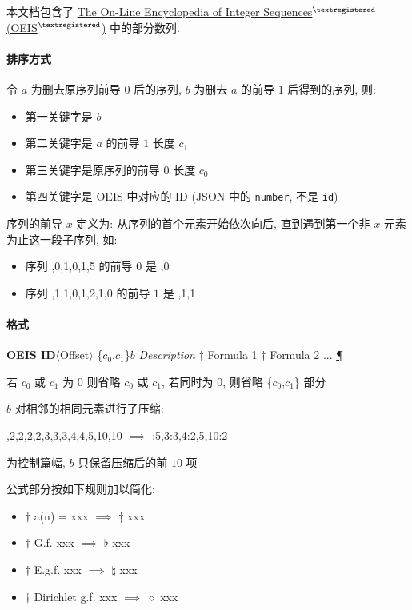 \documentclass{oeiscommon}
\begin{document}
\thispagestyle{empty}

本文档包含了 \href{\oeis}{The On-Line Encyclopedia of Integer Sequences{\(^{\textregistered}\)} (OEIS{\(^{\textregistered}\)})} 中的部分数列.

\paragraph{排序方式} 令 \(a\) 为删去原序列前导 \(0\) 后的序列, \(b\) 为删去 \(a\) 的前导 \(1\) 后得到的序列, 则:

\begin{itemize}
    \item 第一关键字是 \(b\)
    \item 第二关键字是 \(a\) 的前导 \(1\) 长度 \(c_1\)
    \item 第三关键字是原序列的前导 \(0\) 长度 \(c_0\)
    \item 第四关键字是 OEIS 中对应的 ID (JSON 中的 \verb|number|, 不是 \verb|id|)
\end{itemize}

序列的前导 \(x\) 定义为: 从序列的首个元素开始依次向后, 直到遇到第一个非 \(x\) 元素为止这一段子序列, 如:

\begin{itemize}
    \item 序列 {,0,1,0,1,5} 的前导 \(0\) 是 {,0}
    \item 序列 {,1,1,0,1,2,1,0} 的前导 \(1\) 是 {,1,1}
\end{itemize}

\paragraph{格式} \textbf{OEIS ID}\(\langle\)Offset\(\rangle\) \{\(c_0\),\(c_1\)\}\(b\) \textit{Description} \(\dagger\) Formula 1  \(\dagger\) Formula 2 ... \href{\oeis}{\P}

若 \(c_0\) 或 \(c_1\) 为 \(0\) 则省略 \(c_0\) 或 \(c_1\), 若同时为 \(0\), 则省略 \{\(c_0\),\(c_1\)\} 部分

\(b\) 对相邻的相同元素进行了压缩:

{,2,2,2,2,3,3,3,4,4,5,10,10} \(\implies\) {:5,3:3,4:2,5,10:2}

为控制篇幅, \(b\) 只保留压缩后的前 \(10\) 项

公式部分按如下规则加以简化:

\begin{itemize}
    \item \(\dagger\) a(n) = xxx \(\implies\) \(\ddagger\) xxx 
    \item \(\dagger\) G.f. xxx \(\implies\) \(\flat\) xxx 
    \item \(\dagger\) E.g.f. xxx \(\implies\) \(\natural\) xxx 
    \item \(\dagger\) Dirichlet g.f. xxx \(\implies\) \(\diamond\) xxx 
\end{itemize}
\end{document}
